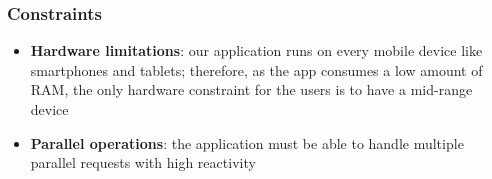 \subsubsection{Constraints}
\begin{itemize}
\item{\textbf{Hardware limitations}}: our application runs on every mobile device like smartphones and tablets; therefore, as the app consumes a low amount of RAM, the only hardware constraint for the users is to have a mid-range device
\item{\textbf{Parallel operations}}: the application must be able to handle multiple parallel requests with high reactivity
\end{itemize}



